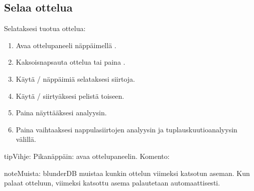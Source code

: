 \documentclass[letterpaper,10pt,finnish]{sphinxmanual}
\begin{document}
\subsection{Selaa ottelua}
\label{\detokenize{guide_utilisateur:naviguer-dans-un-match}}
\sphinxAtStartPar
Selataksesi tuotua ottelua:
\begin{enumerate}
%
\item {} 
\sphinxAtStartPar
Avaa ottelupaneeli näppäimellä .

\item {} 
\sphinxAtStartPar
Kaksoisnapsauta ottelua tai paina .

\item {} 
\sphinxAtStartPar
Käytä  /  \sphinxhyphen{}näppäimiä selataksesi siirtoja.

\item {} 
\sphinxAtStartPar
Käytä  /  siirtyäksesi pelistä toiseen.

\item {} 
\sphinxAtStartPar
Paina  näyttääksesi analyysin.

\item {} 
\sphinxAtStartPar
Paina  vaihtaaksesi nappulasiirtojen analyysin ja tuplauskuutioanalyysin välillä.

\end{enumerate}

\begin{sphinxadmonition}{tip}{Vihje:}
\sphinxAtStartPar
Pikanäppäin:  avaa ottelupaneelin. Komento: 
\end{sphinxadmonition}

\begin{sphinxadmonition}{note}{Muista:}
\sphinxAtStartPar
blunderDB muistaa kunkin ottelun viimeksi katsotun aseman. Kun palaat otteluun, viimeksi katsottu asema palautetaan automaattisesti.
\end{sphinxadmonition}
\end{document}
